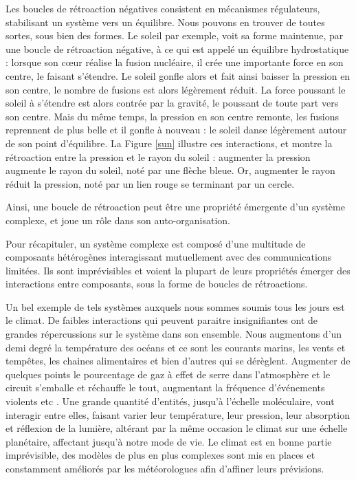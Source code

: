 		Les boucles de rétroaction négatives consistent en mécanismes régulateurs, stabilisant un système vers un équilibre. Nous pouvons en trouver de toutes sortes, sous bien des formes. Le soleil par exemple, voit sa forme maintenue, par une boucle de rétroaction négative, à ce qui est appelé un équilibre hydrostatique \cite{haubold_analytic_1992} : lorsque son cœur réalise la fusion nucléaire, il crée une importante force en son centre, le faisant s'étendre. Le soleil gonfle alors et fait ainsi baisser la pression en son centre, le nombre de fusions est alors légèrement réduit. La force poussant le soleil à s'étendre est alors contrée par la gravité, le poussant de toute part vers son centre. Mais du même temps, la pression en son centre remonte, les fusions reprennent de plus belle et il gonfle à nouveau : le soleil danse légèrement autour de son point d'équilibre. La Figure \ref{sun} illustre ces interactions, et montre la rétroaction entre la pression et le rayon du soleil : augmenter la pression augmente le rayon du soleil, noté par une flèche bleue. Or, augmenter le rayon réduit la pression, noté par un lien rouge se terminant par un cercle.
		
		Ainsi, une boucle de rétroaction peut être une propriété émergente d'un système complexe, et joue un rôle dans son auto-organisation.
			
			Pour récapituler, un système complexe est composé d'une multitude de composants hétérogènes interagissant mutuellement avec des communications limitées. Ils sont imprévisibles et voient la plupart de leurs propriétés émerger des interactions entre composants, sous la forme de boucles de rétroactions.
			
			Un bel exemple de tels systèmes auxquels nous sommes soumis tous les jours est le climat. De faibles interactions qui peuvent paraitre insignifiantes ont de grandes répercussions sur le système dans son ensemble. Nous augmentons d'un demi degré la température des océans et ce sont les courants marins, les vents et tempêtes, les chaines alimentaires et bien d'autres qui se dérèglent. Augmenter de quelques points le pourcentage de gaz à effet de serre dans l'atmosphère et le circuit s'emballe et réchauffe le tout, augmentant la fréquence d'événements violents etc \cite{allen_2018_2018}. Une grande quantité d'entités, jusqu'à l'échelle moléculaire, vont interagir entre elles, faisant varier leur température, leur pression, leur absorption et réflexion de la lumière, altérant par la même occasion le climat sur une échelle planétaire, affectant jusqu'à notre mode de vie. Le climat est en bonne partie imprévisible, des modèles de plus en plus complexes sont mis en places et constamment améliorés par les météorologues afin d'affiner leurs prévisions.
						
